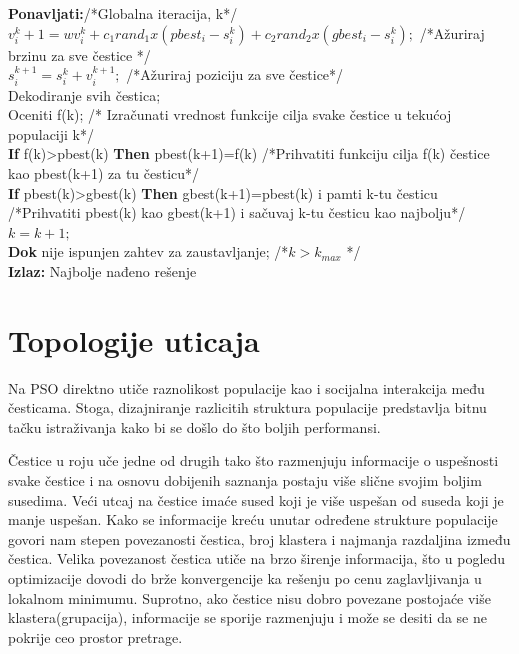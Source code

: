 \documentclass[a4paper]{article}
\begin{document}
\textbf{Ponavljati:}/*Globalna iteracija, k*/ \\
\hspace*{5mm}$v_{i}^k+1 = wv_{i}^k + c_{1}rand_{1} x (pbest_{i} - s_{i}^k) + c_{2}rand_{2} x (gbest_{i} - s_{i}^k);$ /*Ažuriraj brzinu za sve čestice */ \\
\hspace*{5mm}$s_{i}^{k+1} = s_{i}^k + v_{i}^{k+1};$ /*Ažuriraj poziciju za sve čestice*/ \\
\hspace*{5mm}Dekodiranje svih čestica; \\
\hspace*{5mm}Oceniti f(k); /* Izračunati vrednost funkcije cilja svake čestice u tekućoj populaciji k*/ \\
\hspace*{5mm}\textbf{If} f(k)>pbest(k) \textbf{Then} pbest(k+1)=f(k) /*Prihvatiti funkciju cilja f(k) čestice kao pbest(k+1) za tu česticu*/ \\
\hspace*{5mm}\textbf{If} pbest(k)>gbest(k) \textbf{Then} gbest(k+1)=pbest(k) i pamti k-tu česticu  /*Prihvatiti pbest(k) kao gbest(k+1) i sačuvaj k-tu česticu kao najbolju*/ \\
\hspace*{5mm}$k = k+1;$ \\
\textbf{Dok} nije ispunjen zahtev za zaustavljanje; /*$k > k_{max}$  */ \\
\textbf{Izlaz:} Najbolje nađeno rešenje \\

\section{Topologije uticaja}


Na PSO direktno utiče raznolikost populacije kao i socijalna interakcija među česticama. Stoga, dizajniranje razlicitih struktura populacije predstavlja bitnu tačku istraživanja kako bi se došlo do što boljih performansi.

Čestice u roju uče jedne od drugih tako što razmenjuju informacije o uspešnosti svake čestice i na osnovu dobijenih saznanja postaju više slične svojim boljim susedima. Veći utcaj na čestice imaće sused koji je više uspešan od suseda koji je manje uspešan. Kako se informacije kreću unutar određene strukture populacije govori nam stepen povezanosti čestica, broj klastera i najmanja razdaljina između čestica. Velika povezanost čestica utiče na brzo širenje informacija, što u pogledu optimizacije dovodi do brže konvergencije ka rešenju po cenu zaglavljivanja u lokalnom minimumu. Suprotno, ako čestice nisu dobro povezane postojaće više klastera(grupacija), informacije se sporije razmenjuju i može se desiti da se ne pokrije ceo prostor pretrage.
\end{document}
